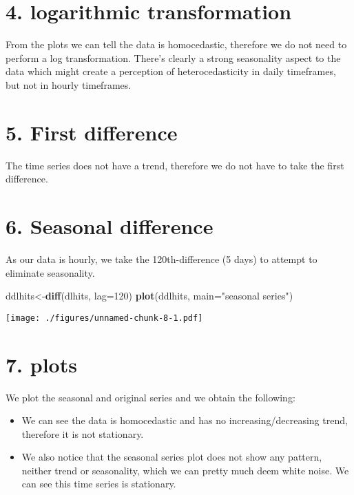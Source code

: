\documentclass[]{article}
\newenvironment{Shaded}{\begin{snugshade}}{\end{snugshade}}
\newcommand{\DataTypeTok}[1]{\textcolor[rgb]{0.13,0.29,0.53}{#1}}
\newcommand{\DecValTok}[1]{\textcolor[rgb]{0.00,0.00,0.81}{#1}}
\newcommand{\KeywordTok}[1]{\textcolor[rgb]{0.13,0.29,0.53}{\textbf{#1}}}
\newcommand{\NormalTok}[1]{#1}
\newcommand{\StringTok}[1]{\textcolor[rgb]{0.31,0.60,0.02}{#1}}
\begin{document}
\newpage

\hypertarget{logarithmic-transformation}{%
\section{4. logarithmic
transformation}\label{logarithmic-transformation}}

From the plots we can tell the data is homocedastic, therefore we do not
need to perform a log transformation. There's clearly a strong
seasonality aspect to the data which might create a perception of
heterocedasticity in daily timeframes, but not in hourly timeframes.

\hypertarget{first-difference}{%
\section{5. First difference}\label{first-difference}}

The time series does not have a trend, therefore we do not have to take
the first difference.

\hypertarget{seasonal-difference}{%
\section{6. Seasonal difference}\label{seasonal-difference}}

As our data is hourly, we take the 120th-difference (5 days) to attempt
to eliminate seasonality.

\begin{Shaded}
\begin{Highlighting}[]
\NormalTok{ddlhits<-}\KeywordTok{diff}\NormalTok{(dlhits, }\DataTypeTok{lag=}\DecValTok{120}\NormalTok{)}
\KeywordTok{plot}\NormalTok{(ddlhits, }\DataTypeTok{main=}\StringTok{"seasonal series"}\NormalTok{)}
\end{Highlighting}
\end{Shaded}

\texttt{[image: ./figures/unnamed-chunk-8-1.pdf]}

\newpage

\hypertarget{plots}{%
\section{7. plots}\label{plots}}

We plot the seasonal and original series and we obtain the following:

\begin{itemize}
\item
  We can see the data is homocedastic and has no increasing/decreasing
  trend, therefore it is not stationary.
\item
  We also notice that the seasonal series plot does not show any
  pattern, neither trend or seasonality, which we can pretty much deem
  white noise. We can see this time series is stationary.
\end{itemize}
\end{document}
